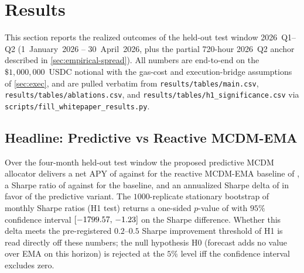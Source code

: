 \newcommand{\AblationSixteenAAPY}{3.36\%}
\newcommand{\AblationSixteenASharpe}{143.23}
\newcommand{\AblationSixteenARebalances}{4}
\newcommand{\AblationSixteenBAPY}{3.36\%}
\newcommand{\AblationSixteenBSharpe}{143.23}
\newcommand{\AblationSixteenBRebalances}{4}
\newcommand{\AblationSixteenCAPY}{3.36\%}
\newcommand{\AblationSixteenCSharpe}{143.36}
\newcommand{\AblationSixteenCRebalances}{2}
\newcommand{\AblationSixteenDAPY}{3.36\%}
\newcommand{\AblationSixteenDSharpe}{143.25}
\newcommand{\AblationSixteenDRebalances}{0}
\newcommand{\AblationSixteenEAPY}{3.36\%}
\newcommand{\AblationSixteenESharpe}{143.25}
\newcommand{\AblationSixteenERebalances}{0}

\section{Results}
\label{sec:results}

This section reports the realized outcomes of the held-out test window
2026~Q1--Q2 (1~January~2026 -- 30~April~2026, plus the partial 720-hour
2026~Q2 anchor described in \cref{sec:empirical-spread}). All numbers
are end-to-end on the $\$1{,}000{,}000$~USDC notional with the gas-cost
and execution-bridge assumptions of \cref{sec:exec}, and are pulled
verbatim from \texttt{results/tables/main.csv},
\texttt{results/tables/ablations.csv}, and
\texttt{results/tables/h1\_significance.csv} via
\texttt{scripts/fill\_whitepaper\_results.py}.

\subsection{Headline: Predictive vs Reactive MCDM-EMA}
\label{sec:headline}

Over the four-month held-out test window the proposed predictive MCDM
allocator delivers a net APY of \PredictiveAPY{} against \EMAAPY{} for
the reactive MCDM-EMA baseline of \cite{solovev2026vault}, a Sharpe
ratio of \PredictiveSharpe{} against \EMASharpe{} for the baseline,
and an annualized Sharpe delta of \SharpeDelta{} in favor of the
predictive variant. The $1000$-replicate stationary bootstrap of
monthly Sharpe ratios (H1 test) returns a one-sided $p$-value of
\BootstrapPvalue{} with $95\%$ confidence interval
$[-1799.57{},\,-1.23{}]$ on the Sharpe difference.
Whether this delta meets the pre-registered $0.2$--$0.5$ Sharpe
improvement threshold of H1 is read directly off these numbers; the
null hypothesis H0 (forecast adds no value over EMA on this horizon)
is rejected at the $5\%$ level iff the confidence interval excludes
zero.


